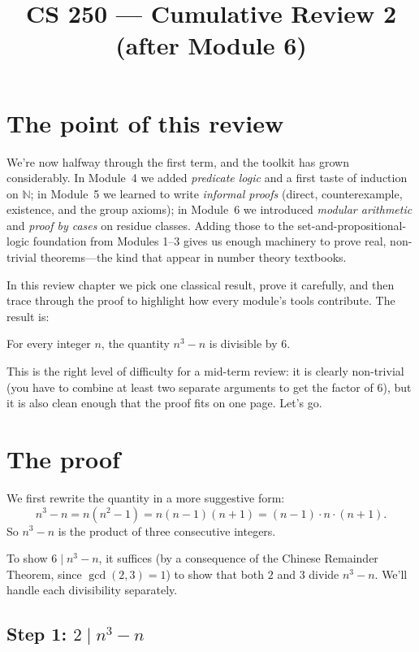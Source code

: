 \documentclass[11pt]{article}
\title{CS 250 --- Cumulative Review 2 (after Module 6)}
\author{}
\date{}
\begin{document}
\maketitle

\section*{The point of this review}

We're now halfway through the first term, and the toolkit has grown considerably. In Module~4 we added \emph{predicate logic} and a first taste of induction on $\mathbb{N}$; in Module~5 we learned to write \emph{informal proofs} (direct, counterexample, existence, and the group axioms); in Module~6 we introduced \emph{modular arithmetic} and \emph{proof by cases} on residue classes. Adding those to the set-and-propositional-logic foundation from Modules 1--3 gives us enough machinery to prove real, non-trivial theorems---the kind that appear in number theory textbooks.

In this review chapter we pick one classical result, prove it carefully, and then trace through the proof to highlight how every module's tools contribute. The result is:

\begin{theorem}
For every integer $n$, the quantity $n^3 - n$ is divisible by $6$.
\end{theorem}

This is the right level of difficulty for a mid-term review: it is clearly non-trivial (you have to combine at least two separate arguments to get the factor of $6$), but it is also clean enough that the proof fits on one page. Let's go.

\section*{The proof}

We first rewrite the quantity in a more suggestive form:
\[
  n^3 - n = n(n^2 - 1) = n(n-1)(n+1) = (n-1) \cdot n \cdot (n+1).
\]
So $n^3 - n$ is the product of three consecutive integers.

To show $6 \mid n^3 - n$, it suffices (by a consequence of the Chinese Remainder Theorem, since $\gcd(2, 3) = 1$) to show that both $2$ and $3$ divide $n^3 - n$. We'll handle each divisibility separately.

\subsection*{Step 1: $2 \mid n^3 - n$}
\end{document}
